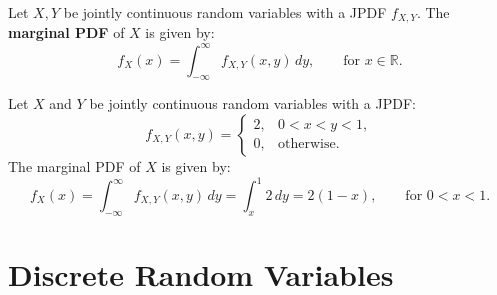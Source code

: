 \documentclass{huhtakm-template-book-v2}
\begin{document}
    \begin{defn}
        Let $X,Y$ be jointly continuous random variables with a JPDF $f_{X,Y}$. The \textbf{marginal PDF} of $X$ is given by:
        \begin{equation*}
            f_{X}(x) = \int_{-\infty}^{\infty}f_{X,Y}(x, y)\,dy, \qquad\text{for }x \in \mathbb{R}.
        \end{equation*}
    \end{defn}
    \begin{eg}
        Let $X$ and $Y$ be jointly continuous random variables with a JPDF:
        \begin{equation*}
            f_{X,Y}(x, y) = \begin{cases}
                2, &0 < x < y < 1,\\
                0, &\text{otherwise}.
            \end{cases}
        \end{equation*}
        The marginal PDF of $X$ is given by:
        \begin{equation*}
            f_{X}(x) = \int_{-\infty}^{\infty}f_{X,Y}(x, y)\,dy = \int_{x}^{1}2\,dy = 2(1-x), \qquad\text{for }0 < x < 1.
        \end{equation*}
    \end{eg}

\chapter{Discrete Random Variables}
    \label{Chapter 4 (Discrete Random Variables)}
\end{document}
